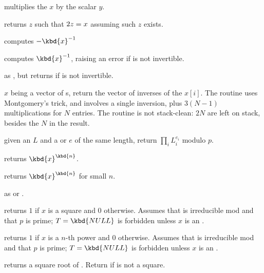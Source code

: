  multiplies the  $x$
by the scalar $y$.

 returns $z$ such that $2\*z = x$
assuming such $z$ exists.



 computes $-\kbd{x}^{-1}$

 computes $\kbd{x}^{-1}$, raising an
error if  is not invertible.

 as , but returns
 if  is not invertible.


 $x$ being a vector of s,
return the vector of inverses of the $x[i]$. The routine uses Montgomery's
trick, and involves a single inversion, plus $3(N-1)$ multiplications for
$N$ entries. The routine is not stack-clean: $2N$  are left on
stack, besides the $N$ in the result.

 given an  $L$
and a  or  $e$ of the same length, return $\prod_i L_i^{e_i}$
modulo $p$.

 returns $\kbd{x}^\kbd{n}$.

 returns $\kbd{x}^\kbd{n}$
for small $n$.

 as
 or .

 returns $1$ if $x$ is a square
and $0$ otherwise. Assumes that  is irreducible mod  and that
$p$ is prime; $T = \kbd{NULL}$ is forbidden unless $x$ is an .

 returns $1$ if $x$
is a $n$-th power and $0$ otherwise. Assumes that  is irreducible mod
 and that $p$ is prime; $T = \kbd{NULL}$ is forbidden unless $x$ is an
.

 returns a square root of .
Return  if  is not a square.

